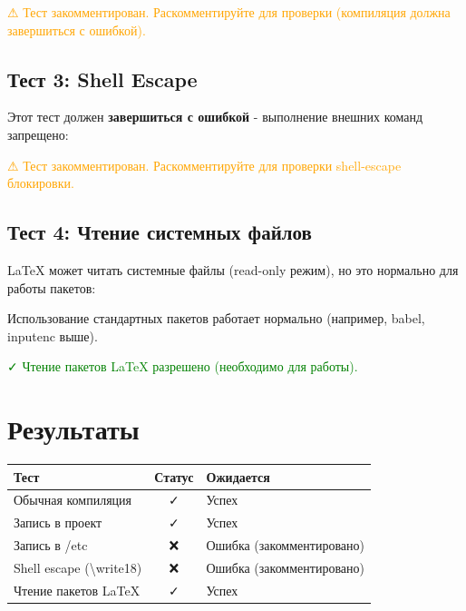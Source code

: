 \documentclass{article}
\begin{document}

\textcolor{orange}{⚠ Тест закомментирован. Раскомментируйте для проверки (компиляция должна завершиться с ошибкой).}

\subsection{Тест 3: Shell Escape}

Этот тест должен \textbf{завершиться с ошибкой} - выполнение внешних команд запрещено:



\textcolor{orange}{⚠ Тест закомментирован. Раскомментируйте для проверки shell-escape блокировки.}

\subsection{Тест 4: Чтение системных файлов}

LaTeX может читать системные файлы (read-only режим), но это нормально для работы пакетов:

Использование стандартных пакетов работает нормально (например, babel, inputenc выше).

\textcolor{green}{✓ Чтение пакетов LaTeX разрешено (необходимо для работы).}

\section{Результаты}

\begin{tabular}{|l|c|l|}
\hline
\textbf{Тест} & \textbf{Статус} & \textbf{Ожидается} \\
\hline
Обычная компиляция & ✓ & Успех \\
\hline
Запись в проект & ✓ & Успех \\
\hline
Запись в /etc & ❌ & Ошибка (закомментировано) \\
\hline
Shell escape (\textbackslash{}write18) & ❌ & Ошибка (закомментировано) \\
\hline
Чтение пакетов LaTeX & ✓ & Успех \\
\hline
\end{tabular}
\end{document}

